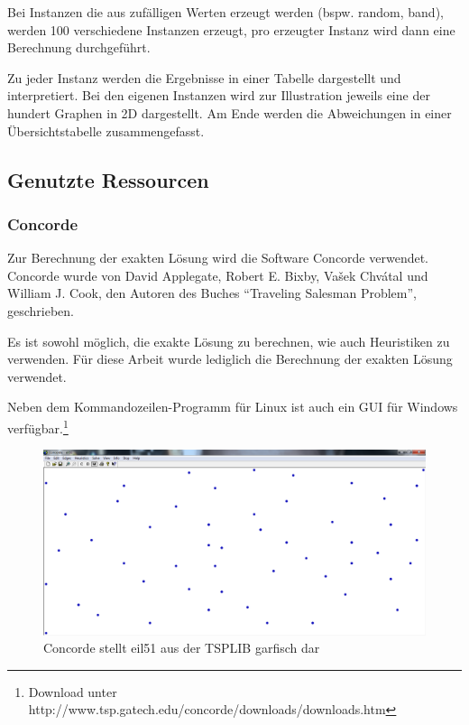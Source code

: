 \documentclass[11pt,a4paper]{article}
\begin{document}
Bei Instanzen die aus zufälligen Werten erzeugt werden (bspw. random, band), werden 100 verschiedene Instanzen erzeugt, pro erzeugter Instanz wird dann eine Berechnung durchgeführt.

Zu jeder Instanz werden die Ergebnisse in einer Tabelle dargestellt und interpretiert. Bei den eigenen Instanzen wird zur Illustration jeweils eine der hundert Graphen in 2D dargestellt. Am Ende werden die Abweichungen in einer Übersichtstabelle zusammengefasst.

\subsection{Genutzte Ressourcen}
\subsubsection{Concorde}
Zur Berechnung der exakten Lösung wird die Software Concorde verwendet. Concorde wurde von David Applegate, Robert E. Bixby, Vašek Chvátal und William J. Cook, den Autoren des Buches "`Traveling Salesman Problem"'\cite{applegate06}, geschrieben.

Es ist sowohl möglich, die exakte Lösung zu berechnen, wie auch Heuristiken zu verwenden. Für diese Arbeit wurde lediglich die Berechnung der exakten Lösung verwendet.

Neben dem Kommandozeilen-Programm für Linux ist auch ein GUI für Windows verfügbar.\footnote{Download unter http://www.tsp.gatech.edu/concorde/downloads/downloads.htm}

\begin{figure}[H]
        \centering
        \includegraphics[width=14cm]{gfx/concorde_cities}
        \caption{Concorde stellt eil51 aus der TSPLIB garfisch dar}
        \label{img:concorde_cities}
\end{figure}
\end{document}
